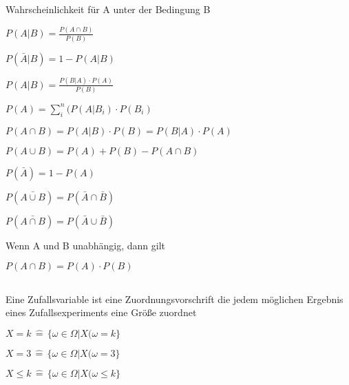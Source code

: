 \documentclass[10pt,a4paper,landscape]{article}
\begin{document}
\begin{multicols*}{4}
\subsection{}

\parbox{\columnwidth}{\centering Wahrscheinlichkeit für A unter der Bedingung B}
\parbox{\columnwidth}{\centering $P(A \vert B) = \frac{P(A \cap B)}{P(B)}$}
\parbox{\columnwidth}{\centering $P(\bar{A} \vert B) = 1 - P(A \vert B)$}

\parbox{\columnwidth}{\centering $P(A \vert B) = \frac{P(B \vert A) \cdot P(A)}{P(B)}$}

\parbox{\columnwidth}{\centering $P(A) = \sum \limits_{i}^n (P(A \vert B_i) \cdot P(B_i)$}

\parbox{\columnwidth}{\centering $P(A \cap B) = P(A \vert B) \cdot P(B) = P(B \vert A) \cdot P(A)$}
\parbox{\columnwidth}{\centering $P(A \cup B) = P(A) + P(B) - P(A \cap B)$}
\parbox{\columnwidth}{\centering $P(\bar{A}) = 1 - P(A)$}
\parbox{\columnwidth}{\centering $P(\bar{A \cup B}) = P(\bar{A} \cap \bar{B})$}
\parbox{\columnwidth}{\centering $P(\bar{A \cap B}) = P(\bar{A} \cup \bar{B})$}
\parbox{\columnwidth}{\centering Wenn A und B unabhängig, dann gilt}
\parbox{\columnwidth}{\centering $P(A \cap B) = P(A) \cdot P(B)$}

\subsection{}

\parbox{\columnwidth}{\centering Eine Zufallsvariable ist eine Zuordnungsvorschrift die jedem  möglichen Ergebnis eines Zufallsexperiments eine Größe zuordnet}
\parbox{\columnwidth}{\centering $X = k \, \widehat{=} \, \{ \omega \in \Omega \vert X( \omega = k \}$}
\parbox{\columnwidth}{\centering $X = 3 \, \widehat{=} \, \{ \omega \in \Omega \vert X( \omega = 3 \}$}
\parbox{\columnwidth}{\centering $X \leq k \, \widehat{=} \, \{ \omega \in \Omega \vert X( \omega \leq k \}$}

\subsection{}


\end{multicols*}
\end{document}
